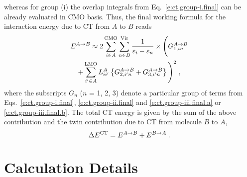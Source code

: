 whereas for group (i) the overlap integrals from Eq.~\eqref{e:ct.group-i.final} 
can be already evaluated in CMO basis.
Thus, the final working formula for the interaction energy due to CT from $A$ to $B$ reads
%
\begin{multline} \label{e:ect-oep.final}
 E^{A\rightarrow B} \approx
 2 
 \sum_{i\in A}^{\rm CMO}
 \sum_{n\in B}^{\rm Vir}
 \frac{1}{\varepsilon_i - \varepsilon_n} \times 
 \Bigg(
   G_{1,in}^{A\rightarrow B} \\
  +
   \sum_{i'\in A}^{\rm LMO} L_{ii'}^A
   \left\{
   G_{2,i'n}^{A\rightarrow B}
  +G_{3,i'n}^{A\rightarrow B}
  \right\}
 \Bigg)^2 \;,
\end{multline}
%
where the subscripts $G_n$ ($n$ = 1, 2, 3) denote a particular group of 
terms from Eqs.~\eqref{e:ct.group-i.final}, \eqref{e:ct.group-ii.final} and \eqref{e:ct.group-iii.final.a}
or \eqref{e:ct.group-iii.final.b}. 
The total CT energy is given by the sum of the above contribution and the twin contribution
due to CT from molecule $B$ to $A$,
%
\begin{equation}
 \Delta E^{\rm CT} = E^{A\rightarrow B} + E^{B\rightarrow A} \;.
\end{equation}
%

%
%




\section{\label{s:4}Calculation Details}

